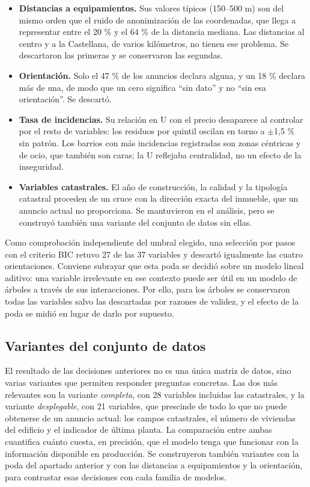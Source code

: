 \documentclass[11pt,a4paper]{article}
\begin{document}
\begin{itemize}[leftmargin=1.5em,itemsep=2pt,topsep=2pt]
\item \textbf{Distancias a equipamientos.} Sus valores típicos (150--500 m) son del mismo orden que el ruido de anonimización de las coordenadas, que llega a representar entre el 20 \% y el 64 \% de la distancia mediana. Las distancias al centro y a la Castellana, de varios kilómetros, no tienen ese problema. Se descartaron las primeras y se conservaron las segundas.
\item \textbf{Orientación.} Solo el 47 \% de los anuncios declara alguna, y un 18 \% declara más de una, de modo que un cero significa ``sin dato'' y no ``sin esa orientación''. Se descartó.
\item \textbf{Tasa de incidencias.} Su relación en U con el precio desaparece al controlar por el resto de variables: los residuos por quintil oscilan en torno a $\pm$1,5 \% sin patrón. Los barrios con más incidencias registradas son zonas céntricas y de ocio, que también son caras; la U reflejaba centralidad, no un efecto de la inseguridad.
\item \textbf{Variables catastrales.} El año de construcción, la calidad y la tipología catastral proceden de un cruce con la dirección exacta del inmueble, que un anuncio actual no proporciona. Se mantuvieron en el análisis, pero se construyó también una variante del conjunto de datos sin ellas.
\end{itemize}

Como comprobación independiente del umbral elegido, una selección por pasos con el criterio BIC retuvo 27 de las 37 variables y descartó igualmente las cuatro orientaciones. Conviene subrayar que esta poda se decidió sobre un modelo lineal aditivo: una variable irrelevante en ese contexto puede ser útil en un modelo de árboles a través de sus interacciones. Por ello, para los árboles se conservaron todas las variables salvo las descartadas por razones de validez, y el efecto de la poda se midió en lugar de darlo por supuesto.

\subsection{Variantes del conjunto de datos}

El resultado de las decisiones anteriores no es una única matriz de datos, sino varias variantes que permiten responder preguntas concretas. Las dos más relevantes son la variante \emph{completa}, con 28 variables incluidas las catastrales, y la variante \emph{desplegable}, con 21 variables, que prescinde de todo lo que no puede obtenerse de un anuncio actual: los campos catastrales, el número de viviendas del edificio y el indicador de última planta. La comparación entre ambas cuantifica cuánto cuesta, en precisión, que el modelo tenga que funcionar con la información disponible en producción. Se construyeron también variantes con la poda del apartado anterior y con las distancias a equipamientos y la orientación, para contrastar esas decisiones con cada familia de modelos.
\end{document}
